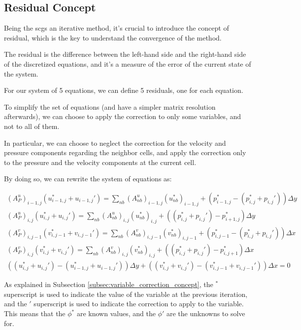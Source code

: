 \subsection{Residual Concept}
\label{subsec:residual_concept}

Being the \acrshort{scgs} an iterative method, it's crucial to introduce the concept of residual, which is the key to understand the convergence of the method.

The residual is the difference between the left-hand side and the right-hand side of the discretized equations, and it's a measure of the error of the current state of the system.

For our system of 5 equations, we can define 5 residuals, one for each equation.

To simplify the set of equations (and have a simpler matrix resolution afterwards), we can choose to apply the correction to only some variables, and not to all of them.

In particular, we can choose to neglect the correction for the velocity and pressure components regarding the neighbor cells, and apply the correction only to the pressure and the velocity components at the current cell.

By doing so, we can rewrite the system of equations as:

\begin{gather}
    (A_P^u)_{i-1,j} (u_{i-1,j}^*+u_{i-1,j}') = \sum_{nb} (A_{nb}^u)_{i-1,j} (u_{nb}^*)_{i-1,j} + (p_{i-1,j}^* - (p_{i,j}^* + p_{i,j}')) \Delta y \\
    (A_P^u)_{i,j}   (u_{i,j}  ^*+u_{i,j}')   = \sum_{nb} (A_{nb}^u)_{i,j} (u_{nb}^*)_{i,j}     + ((p_{i,j}^* + p_{i,j}') - p_{i+1,j}^*) \Delta y   \\
    (A_P^v)_{i,j-1} (v_{i,j-1}^*+v_{i,j-1}') = \sum_{nb} (A_{nb}^v)_{i,j-1} (v_{nb}^*)_{i,j-1} + (p_{i,j-1}^* - (p_{i,j}^* + p_{i,j}')) \Delta x \\
    (A_P^v)_{i,j}   (v_{i,j}  ^*+v_{i,j}')   = \sum_{nb} (A_{nb}^v)_{i,j} (v_{nb}^*)_{i,j}     + ((p_{i,j}^* + p_{i,j}') - p_{i,j+1}^*) \Delta x   \\
    ((u_{i,j}  ^*+u_{i,j}') - (u_{i-1,j}^*+u_{i-1,j}')) \Delta y + ((v_{i,j}  ^*+v_{i,j}') - (v_{i,j-1}^*+v_{i,j-1}')) \Delta x = 0
\end{gather}

As explained in Subsection \ref{subsec:variable_correction_concept}, the $^*$ superscript is used to indicate the value of the variable at the previous iteration, and the $'$ superscript is used to indicate the correction to apply to the variable.
This means that the $\phi^*$ are known values, and the $\phi'$ are the unknowns to solve for.

